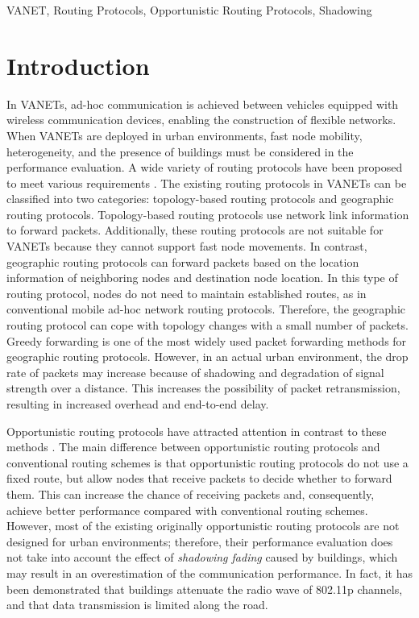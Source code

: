 \documentclass[conference]{IEEEtran}
\begin{document}
\begin{IEEEkeywords}
VANET, Routing Protocols, Opportunistic Routing Protocols, Shadowing
\end{IEEEkeywords}

\section{Introduction}
In VANETs,  ad-hoc communication is achieved between vehicles equipped with wireless communication devices, enabling the construction of flexible networks. 
When VANETs are deployed in  urban environments, fast node mobility, heterogeneity, and the presence of buildings must be considered in the performance evaluation. A wide variety of routing protocols have been proposed to meet various requirements \cite{2}.
The existing routing protocols in VANETs can be classified into two categories: topology-based routing protocols and geographic routing protocols. Topology-based routing protocols \cite{3,4,5} use network link information to forward packets. 
Additionally, these routing protocols are not suitable for VANETs because they cannot support fast node movements. In contrast, geographic routing protocols \cite{6, 7, 8 ,9} can forward packets based on the location information of neighboring nodes and destination node location. 
In this type of routing protocol, nodes do not need to maintain established routes, as in conventional mobile ad-hoc network routing protocols. 
Therefore, the geographic routing protocol can cope with topology changes with a small number of packets.
Greedy forwarding is one of the most widely used packet forwarding methods for geographic routing protocols.
However, in an actual urban environment, the drop rate of packets may increase because of shadowing and degradation of signal strength over a distance. This increases the possibility of packet retransmission, resulting in increased overhead and end-to-end delay. 

Opportunistic routing protocols have attracted attention in contrast to these methods \cite{16}. 
The main difference between opportunistic routing protocols and conventional routing schemes is that opportunistic routing protocols do not use a fixed route, but allow nodes that receive packets to decide whether to forward them. 
This can increase the chance of receiving packets and, consequently, achieve better performance compared with conventional routing schemes.
However, most of the existing originally opportunistic routing protocols  are not designed for urban environments; therefore, their performance evaluation does not take into account the effect of \textit{shadowing fading} caused by buildings, which may result in an overestimation of the communication performance. 
In fact, it has been demonstrated that buildings attenuate the radio wave of 802.11p channels, and that data transmission is limited along the road\cite{17}. 
\end{document}
